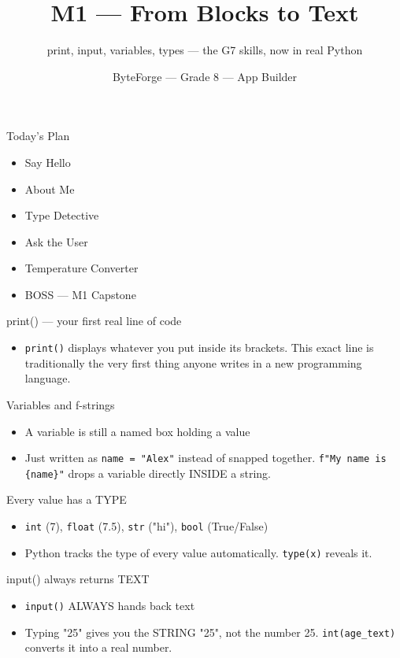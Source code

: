 \documentclass[aspectratio=169]{beamer}
\title{M1 — From Blocks to Text}
\subtitle{print, input, variables, types — the G7 skills, now in real Python}
\author{ByteForge --- Grade 8 --- App Builder}
\date{}
\begin{document}
\begin{frame}
    \titlepage
\end{frame}

\begin{frame}{Today's Plan}
    \begin{itemize}
        \item Say Hello
        \item About Me
        \item Type Detective
        \item Ask the User
        \item Temperature Converter
        \item[$\bigstar$] BOSS --- M1 Capstone
    \end{itemize}
\end{frame}

\begin{frame}{print() — your first real line of code}
    \large
    \begin{itemize}
        \item \texttt{print()} displays whatever you put inside its brackets. This exact line is traditionally the very first thing anyone writes in a new programming language.
    \end{itemize}
\end{frame}


\begin{frame}{Variables and f-strings}
    \large
    \begin{itemize}
        \item A variable is still a named box holding a value
        \item Just written as \texttt{name = "Alex"} instead of snapped together. \texttt{f"My name is \{name\}"} drops a variable directly INSIDE a string.
    \end{itemize}
\end{frame}


\begin{frame}{Every value has a TYPE}
    \large
    \begin{itemize}
        \item \texttt{int} (7), \texttt{float} (7.5), \texttt{str} ("hi"), \texttt{bool} (True/False)
        \item Python tracks the type of every value automatically. \texttt{type(x)} reveals it.
    \end{itemize}
\end{frame}


\begin{frame}{input() always returns TEXT}
    \large
    \begin{itemize}
        \item \texttt{input()} ALWAYS hands back text
        \item Typing "25" gives you the STRING "25", not the number 25. \texttt{int(age\_text)} converts it into a real number.
    \end{itemize}
\end{frame}
\end{document}
